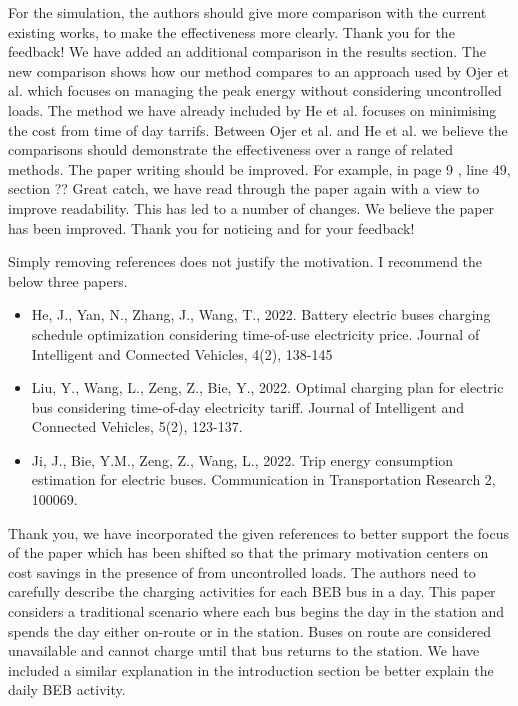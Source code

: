 \documentclass{article}
\begin{document}
\begin{buttkissing}
	\reviewerclaims For the simulation, the authors should give more comparison with the current existing works, to make the effectiveness more clearly.
	\kissbutt Thank you for the feedback! We have added an additional comparison in the results section. The new comparison shows how our method compares to an approach used by Ojer et al. which focuses on managing the peak energy without considering uncontrolled loads. The method we have already included by He et al. focuses on minimising the cost from time of day tarrifs. Between Ojer et al. and He et al. we believe the comparisons should demonstrate the effectiveness over a range of related methods.
	\reviewerclaims The paper writing should be improved. For example, in page 9 , line 49, section ??
	\kissbutt Great catch, we have read through the paper again with a view to improve readability. This has led to a number of changes. We believe the paper has been improved. Thank you for noticing and for your feedback!
\end{buttkissing}
\begin{buttkissing}
	\reviewerclaims Simply removing references does not justify the motivation. I recommend the below three papers.
		\begin{itemize}
			\item He, J., Yan, N., Zhang, J., Wang, T., 2022. Battery electric buses charging schedule optimization considering time-of-use electricity price. Journal of Intelligent and Connected Vehicles, 4(2), 138-145
			\item Liu, Y., Wang, L., Zeng, Z., Bie, Y., 2022. Optimal charging plan for electric bus considering time-of-day electricity tariff. Journal of Intelligent and Connected Vehicles, 5(2), 123-137.
			\item Ji, J., Bie, Y.M., Zeng, Z., Wang, L., 2022. Trip energy consumption estimation for electric buses. Communication in Transportation Research 2, 100069.
		\end{itemize} 
	\kissbutt Thank you, we have incorporated the given references to better support the focus of the paper which has been shifted so that the primary motivation centers on cost savings in the presence of from uncontrolled loads.
	\reviewerclaims The authors need to carefully describe the charging activities for each BEB bus in a day.
	\kissbutt This paper considers a traditional scenario where each bus begins the day in the station and spends the day either on-route or in the station. Buses on route are considered unavailable and cannot charge until that bus returns to the station. We have included a similar explanation in the introduction section be better explain the daily BEB activity.
  \end{buttkissing}
\end{document}
